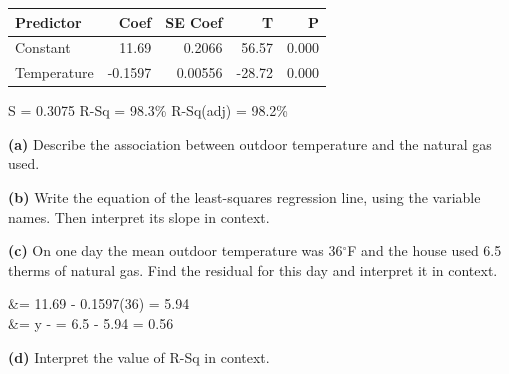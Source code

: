 \documentclass[12pt]{article}
\begin{document}
\begin{enumerate}[leftmargin=1.9em, itemsep=0.16in, resume]
        \vspace{4pt}
        {\centering\footnotesize\ttfamily
        \begin{tabular}{@{} l r r r r @{}}
        Predictor & Coef & SE Coef & T & P \\ \hline
        Constant & 11.69 & 0.2066 & 56.57 & 0.000 \\
        Temperature & -0.1597 & 0.00556 & -28.72 & 0.000 \\
        \end{tabular}\par
        S = 0.3075 \quad R-Sq = 98.3\% \quad R-Sq(adj) = 98.2\%\par}

        \vspace{6pt}
        \textbf{(a)} Describe the association between outdoor temperature and the natural gas
        used.\\[4pt]

        \vspace{6pt}
        \boxguard[16]
        \textbf{(b)} Write the equation of the least-squares regression line, using the
        variable names. Then interpret its slope in context.\\[4pt]

        \vspace{6pt}
        \boxguard[21]
        \textbf{(c)} On one day the mean outdoor temperature was 36$^\circ$F and the house used
        6.5 therms of natural gas. Find the residual for this day and interpret it in context.
        \begin{work}
           &= 11.69 - 0.1597(36) = 5.94  \\
           &= y -  = 6.5 - 5.94 = 0.56 
        \end{work}

        \vspace{6pt}
        \boxguard[15]
        \textbf{(d)} Interpret the value of R-Sq in context.\\[4pt]


\end{enumerate}
\end{document}
